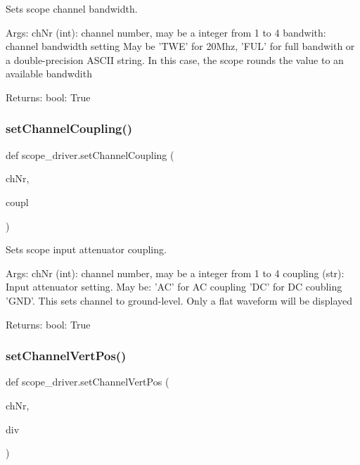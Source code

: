 \begin{DoxyVerb}Sets scope channel bandwidth.

Args:
    chNr (int): channel number, may be a integer from 1 to 4
    bandwith: channel bandwidth setting
        May be 'TWE' for 20Mhz, 'FUL' for full bandwith or a
        double-precision ASCII string. In this case, the scope
        rounds the value to an available bandwdith
    
Returns:
    bool: True\end{DoxyVerb}
 \mbox{\label{namespacescope__driver_adf5686f08f00e219e3135dfc617b2af8}} 
\subsubsection{\texorpdfstring{set\+Channel\+Coupling()}{setChannelCoupling()}}
{\footnotesize\ttfamily def scope\+\_\+driver.\+set\+Channel\+Coupling (\begin{DoxyParamCaption}\item[{}]{ch\+Nr,  }\item[{}]{coupl }\end{DoxyParamCaption})}

\begin{DoxyVerb}Sets scope input attenuator coupling.

Args:
    chNr (int): channel number, may be a integer from 1 to 4
    coupling (str): Input attenuator setting.
        May be:
        'AC' for AC coupling
        'DC' for DC coubling
        'GND'. This sets channel to ground-level. Only a flat
        waveform will be displayed

Returns:
    bool: True
\end{DoxyVerb}
 \mbox{\label{namespacescope__driver_a472b2408b8b9825c9cfbcb8438817306}} 
\subsubsection{\texorpdfstring{set\+Channel\+Vert\+Pos()}{setChannelVertPos()}}
{\footnotesize\ttfamily def scope\+\_\+driver.\+set\+Channel\+Vert\+Pos (\begin{DoxyParamCaption}\item[{}]{ch\+Nr,  }\item[{}]{div }\end{DoxyParamCaption})}

